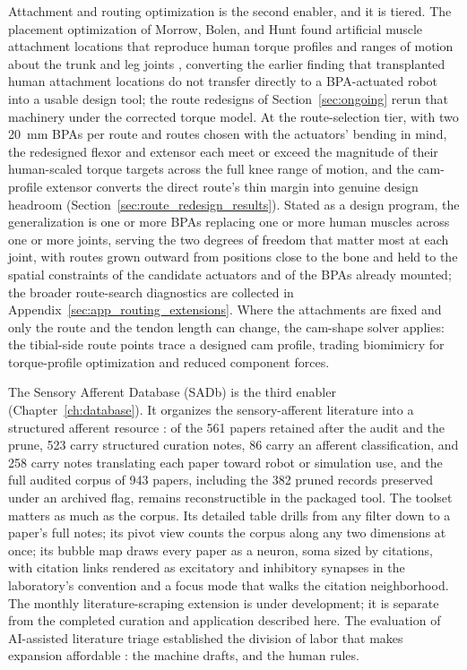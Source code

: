 Attachment and routing optimization is the second enabler, and it is tiered. The placement optimization of Morrow, Bolen, and Hunt found artificial muscle attachment locations that reproduce human torque profiles and ranges of motion about the trunk and leg joints \citep{morrow_optimization_2020}, converting the earlier finding that transplanted human attachment locations do not transfer directly to a BPA-actuated robot \citep{bolen_bipedal_2019, bolen_determination_2019} into a usable design tool; the route redesigns of Section~\ref{sec:ongoing} rerun that machinery under the corrected torque model. At the route-selection tier, with two \qty{20}{\mm} BPAs per route and routes chosen with the actuators' bending in mind, the redesigned flexor and extensor each meet or exceed the magnitude of their human-scaled torque targets across the full knee range of motion, and the cam-profile extensor converts the direct route's thin margin into genuine design headroom (Section~\ref{sec:route_redesign_results}). Stated as a design program, the generalization is one or more BPAs replacing one or more human muscles across one or more joints, serving the two degrees of freedom that matter most at each joint, with routes grown outward from positions close to the bone and held to the spatial constraints of the candidate actuators and of the BPAs already mounted; the broader route-search diagnostics are collected in Appendix~\ref{sec:app_routing_extensions}. Where the attachments are fixed and only the route and the tendon length can change, the cam-shape solver applies: the tibial-side route points trace a designed cam profile, trading biomimicry for torque-profile optimization and reduced component forces.

The Sensory Afferent Database (SADb) is the third enabler (Chapter~\ref{ch:database}). It organizes the sensory-afferent literature into a structured afferent resource \citep{bolen_sensory_2023}: of the 561 papers retained after the audit and the prune, 523 carry structured curation notes, 86 carry an afferent classification, and 258 carry notes translating each paper toward robot or simulation use, and the full audited corpus of 943 papers, including the 382 pruned records preserved under an archived flag, remains reconstructible in the packaged tool. The toolset matters as much as the corpus. Its detailed table drills from any filter down to a paper's full notes; its pivot view counts the corpus along any two dimensions at once; its bubble map draws every paper as a neuron, soma sized by citations, with citation links rendered as excitatory and inhibitory synapses in the laboratory's convention and a focus mode that walks the citation neighborhood. The monthly literature-scraping extension is under development; it is separate from the completed curation and application described here. The evaluation of AI-assisted literature triage established the division of labor that makes expansion affordable \citep{bolen_using_2024}: the machine drafts, and the human rules.

